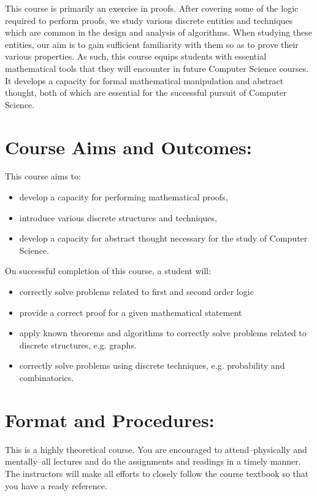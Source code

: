 \documentclass[a4paper]{article}
\begin{document}
This course is primarily an exercise in proofs. After covering some of the logic required to perform proofs, we study various discrete entities and techniques which are common in the design and analysis of algorithms. When studying these entities, our aim is to gain sufficient familiarity with them so as to prove their various properties. As such, this course equips students with essential mathematical tools that they will encounter in future Computer Science courses. It develops a capacity for formal mathematical manipulation and abstract thought, both of which are essential for the successful pursuit of Computer Science.

\section{Course Aims and Outcomes:}

This course aims to:
\begin{itemize}
\item develop a capacity for performing mathematical proofs,
\item introduce various discrete structures and techniques,
\item develop a capacity for abstract thought necessary for the study of Computer Science.
\end{itemize}

On successful completion of this course, a student will:
\begin{itemize}
  \item correctly solve problems related to first and second order logic
  \item provide a correct proof for a given mathematical statement
  \item apply known theorems and algorithms to correctly solve problems related to discrete structures, e.g. graphs.
  \item correctly solve problems using discrete techniques, e.g. probability and combinatorics.
\end{itemize}

\section{Format and Procedures:}

This is a highly theoretical course. You are encouraged to attend--physically and mentally--all lectures and do the assignments and readings in a timely manner. The instructors will make all efforts to closely follow the course textbook so that you have a ready reference.
\end{document}
